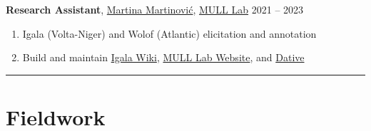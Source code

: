 \documentclass[margin,line]{resume}
\begin{document}
\begin{resume}
	\textbf{Research Assistant}, \href{https://inamartinovic.com/}{Martina Martinović}, \href{https://mull-lab.org/}{MULL Lab} \hfill 2021 -- 2023
	\begin{enumerate}[-, leftmargin=1em, topsep=0.5pt]
		\item[] Igala (Volta-Niger) and Wolof (Atlantic) elicitation and annotation
		\item[] Build and maintain \href{https://wiki.mull-lab.org/Igala/}{Igala Wiki}, \href{https://mull-lab.org/}{MULL Lab Website}, and \href{https://github.com/dativebase/dativerf}{Dative}
	\end{enumerate}%

	\begin{comment}
	\textbf{Full Stack and Mobile Developer}, \href{https://playmind.com/}{PLAYMIND}, Montréal \hfill Mar -- Aug 2021
	\begin{enumerate}[-, leftmargin=1em, topsep=0.5pt]
		\item[] Developed~\href{https://playbox.games/\#home}{
			      PLAYBOX online management portal and Android App}
	\end{enumerate}

	\textbf{Freelance Programmer}, Montréal \hfill 2019 -- 2020
	\begin{enumerate}[-, leftmargin=1em, topsep=0.5pt]
		\item[] Web Development and Python tutoring
	\end{enumerate}

	\textbf{Junior Developer}, \href{https://gls-canada.com/en/dicom/corp/home}{GLS (\textit{fka} Dicom)}, Montréal \hfill Jan -- May 2019
	\begin{enumerate}[-, leftmargin=1em, topsep=0.5pt]
		\item[] Worked on \href{https://gls-canada.com/en/dicom/about-us/news/dicom-launches-smart4-shipping}{smart4 shipping platform} back-end
	\end{enumerate}
	\end{comment}

	\vspace{-0.9em}\rule{\textwidth}{0.4pt}



	\section{\mysidestyle Fieldwork}


\end{resume}
\end{document}

